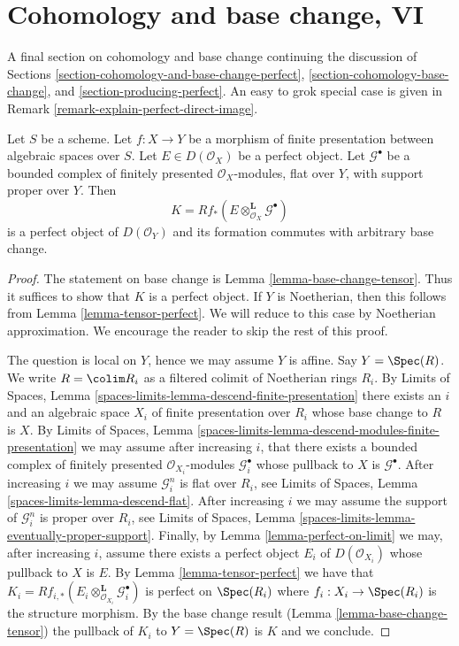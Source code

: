 \section{Cohomology and base change, VI}
\label{section-cohomology-and-base-change-final}

\noindent
A final section on cohomology and base change continuing
the discussion of Sections
\ref{section-cohomology-and-base-change-perfect},
\ref{section-cohomology-base-change}, and
\ref{section-producing-perfect}.
An easy to grok special case is given in
Remark \ref{remark-explain-perfect-direct-image}.

\begin{lemma}
\label{lemma-base-change-tensor-perfect}
Let $S$ be a scheme. Let $f : X \to Y$ be a morphism of finite presentation
between algebraic spaces over $S$. Let $E \in D(\mathcal{O}_X)$ be a perfect
object. Let $\mathcal{G}^\bullet$ be a bounded complex of finitely presented
$\mathcal{O}_X$-modules, flat over $Y$, with support proper over $Y$. Then
$$
K = Rf_*(E \otimes_{\mathcal{O}_X}^\mathbf{L} \mathcal{G}^\bullet)
$$
is a perfect object of $D(\mathcal{O}_Y)$ and its formation
commutes with arbitrary base change.
\end{lemma}

\begin{proof}
The statement on base change is Lemma \ref{lemma-base-change-tensor}.
Thus it suffices to show that $K$ is a perfect object. If $Y$ is
Noetherian, then this follows from
Lemma \ref{lemma-tensor-perfect}.
We will reduce to this case by Noetherian approximation.
We encourage the reader to skip the rest of this proof.

\medskip\noindent
The question is local on $Y$, hence we may assume $Y$ is affine.
Say $Y = \Spec(R)$. We write $R = \colim R_i$ as a filtered colimit
of Noetherian rings $R_i$. By Limits of Spaces, Lemma
\ref{spaces-limits-lemma-descend-finite-presentation}
there exists an $i$ and an algebraic space $X_i$ of finite presentation
over $R_i$ whose base change to $R$ is $X$. By
Limits of Spaces, Lemma
\ref{spaces-limits-lemma-descend-modules-finite-presentation}
we may assume after increasing $i$, that there exists a
bounded complex of finitely
presented $\mathcal{O}_{X_i}$-modules $\mathcal{G}_i^\bullet$ whose
pullback to $X$ is $\mathcal{G}^\bullet$. After increasing $i$
we may assume $\mathcal{G}_i^n$ is flat over $R_i$, see
Limits of Spaces, Lemma
\ref{spaces-limits-lemma-descend-flat}.
After increasing $i$ we may assume the support of $\mathcal{G}_i^n$
is proper over $R_i$, see
Limits of Spaces, Lemma \ref{spaces-limits-lemma-eventually-proper-support}.
Finally, by Lemma \ref{lemma-perfect-on-limit}
we may, after increasing $i$, assume there exists a perfect
object $E_i$ of $D(\mathcal{O}_{X_i})$ whose pullback to
$X$ is $E$. By Lemma \ref{lemma-tensor-perfect} we have that
$K_i =
Rf_{i, *}(E_i \otimes_{\mathcal{O}_{X_i}}^\mathbf{L} \mathcal{G}_i^\bullet)$
is perfect on $\Spec(R_i)$ where $f_i : X_i \to \Spec(R_i)$ is
the structure morphism. By the base change result
(Lemma \ref{lemma-base-change-tensor}) the pullback of $K_i$
to $Y = \Spec(R)$ is $K$ and we conclude.
\end{proof}


